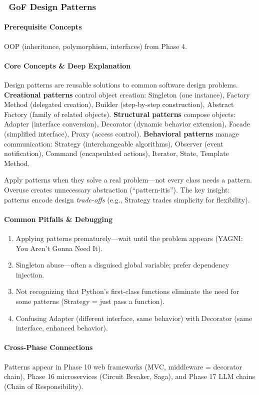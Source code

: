 \documentclass[11pt, a4paper, oneside]{report}
\newcommand{\mustmaster}[1]{\subsubsection{\texorpdfstring{\fcolorbox{blue!40!black}{blue!8}{\footnotesize\bfseries\color{blue!40!black} MUST MASTER}~#1}{#1}}}
\begin{document}
\mustmaster{GoF Design Patterns}

\paragraph{Prerequisite Concepts} OOP (inheritance, polymorphism, interfaces) from Phase 4.

\paragraph{Core Concepts \& Deep Explanation} Design patterns are reusable solutions to common software design problems. \textbf{Creational patterns} control object creation: Singleton (one instance), Factory Method (delegated creation), Builder (step-by-step construction), Abstract Factory (family of related objects). \textbf{Structural patterns} compose objects: Adapter (interface conversion), Decorator (dynamic behavior extension), Facade (simplified interface), Proxy (access control). \textbf{Behavioral patterns} manage communication: Strategy (interchangeable algorithms), Observer (event notification), Command (encapsulated actions), Iterator, State, Template Method.

Apply patterns when they solve a real problem---not every class needs a pattern. Overuse creates unnecessary abstraction (``pattern-itis''). The key insight: patterns encode design \emph{trade-offs} (e.g., Strategy trades simplicity for flexibility).

\paragraph{Common Pitfalls \& Debugging}
\begin{enumerate}[leftmargin=*]
\item Applying patterns prematurely---wait until the problem appears (YAGNI: You Aren't Gonna Need It).
\item Singleton abuse---often a disguised global variable; prefer dependency injection.
\item Not recognizing that Python's first-class functions eliminate the need for some patterns (Strategy = just pass a function).
\item Confusing Adapter (different interface, same behavior) with Decorator (same interface, enhanced behavior).
\end{enumerate}

\paragraph{Cross-Phase Connections} Patterns appear in Phase 10 web frameworks (MVC, middleware = decorator chain), Phase 16 microservices (Circuit Breaker, Saga), and Phase 17 LLM chains (Chain of Responsibility).
\end{document}

